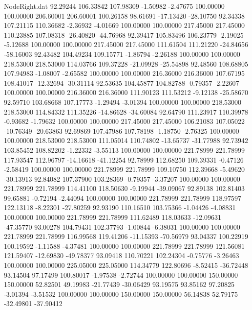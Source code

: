 \begin{filecontents}{NodeRight.dat}
  92.29244  106.33842  107.98309    -1.50982   -2.47675  100.00000  100.00000  206.60001  206.60001  100.26158   98.61691  -17.13420  -28.10750
  92.34338  107.21115  110.36682    -2.36932   -4.01669  100.00000  100.00000  217.45000  217.45000  110.23885  107.08318  -26.40820  -44.76968
  92.39417  105.83496  106.23779    -2.19025   -5.12688  100.00000  100.00000  217.45000  217.45000  111.61504  111.21220  -24.84656  -58.16003
  92.43482  104.49234  109.15771    -1.86794   -2.26188  100.00000  100.00000  218.53000  218.53000  114.03766  109.37228  -21.09928  -25.54898
  92.48560  108.68805  107.94983    -1.08007   -2.65582  100.00000  100.00000  216.36000  216.36000  107.67195  108.41017  -12.32694  -30.31114
  92.53635  104.45877  104.82788    -0.79357   -2.22607  100.00000  100.00000  216.36000  216.36000  111.90123  111.53212   -9.12138  -25.58670
  92.59710  103.68668  107.17773    -1.29494   -3.01394  100.00000  100.00000  218.53000  218.53000  114.84332  111.35226  -14.86628  -34.60084
  92.64790  111.23917  110.39978    -0.93682   -1.79632  100.00000  100.00000  217.45000  217.45000  106.21083  107.05022  -10.76349  -20.63863
  92.69869  107.47986  107.78198    -1.18750   -2.76325  100.00000  100.00000  218.53000  218.53000  111.05014  110.74802  -13.65737  -31.77988
  92.73942  103.85452  108.82202    -1.22332   -3.55113  100.00000  100.00000  221.78999  221.78999  117.93547  112.96797  -14.16618  -41.12254
  92.78999  112.68250  109.39331    -0.47126   -2.58419  100.00000  100.00000  221.78999  221.78999  109.10750  112.39668   -5.49620  -30.13913
  92.84082  107.37900  103.28369    -0.79357   -3.37207  100.00000  100.00000  221.78999  221.78999  114.41100  118.50630   -9.19944  -39.09067
  92.89138  102.81403   99.65881    -0.72194   -2.44094  100.00000  100.00000  221.78999  221.78999  118.97597  122.13118   -8.22301  -27.80259
  92.93190  110.16510  103.75366    -1.04426   -4.08831  100.00000  100.00000  221.78999  221.78999  111.62489  118.03633  -12.09631  -47.35770
  93.00278  104.79431  102.37793    -1.00844   -6.38031  100.00000  100.00000  221.78999  221.78999  116.99568  119.41206  -11.15393  -70.56979
  93.04337  100.22919  100.19592    -1.11588   -4.37481  100.00000  100.00000  221.78999  221.78999  121.56081  121.59407  -12.69830  -49.78377
  93.09418  110.70221  102.24304    -0.75776   -3.26463  100.00000  100.00000  225.05000  225.05000  114.34779  122.80696   -8.52415  -36.72448
  93.14504   97.17499  100.80017    -1.97538   -2.72744  100.00000  100.00000  150.00000  150.00000   52.82501   49.19983  -21.77439  -30.06429
  93.19575   93.85162   97.20825    -3.01394   -3.51532  100.00000  100.00000  150.00000  150.00000   56.14838   52.79175  -32.49801  -37.90412

\end{filecontents}
